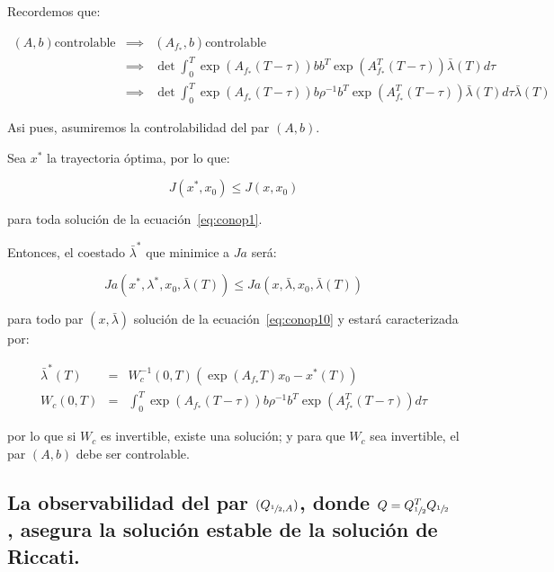             Recordemos que:

            \begin{eqnarray*}
                (A, b) \text{controlable} & \implies & (A_{f_*}, b) \text{controlable} \\
                & \implies & \det{\int_0^T \exp{(A_{f_*}(T - \tau))} b b^T \exp{(A_{f_*}^T (T - \tau))} \bar{\lambda}(T) d\tau} \\
                & \implies & \det{\int_0^T \exp{(A_{f_*}(T - \tau))} b \rho^{-1} b^T \exp{(A_{f_*}^T (T - \tau))} \bar{\lambda}(T) d\tau \bar{\lambda}(T)}
            \end{eqnarray*}

            Asi pues, asumiremos la controlabilidad del par $(A, b)$.

            Sea $x^*$ la trayectoria óptima, por lo que:

            \begin{equation*}
                J(x^*, x_0) \le J(x, x_0)
            \end{equation*}

            para toda solución de la ecuación~\ref{eq:conop1}.

            Entonces, el coestado $\bar{\lambda}^*$ que minimice a $Ja$ será:

            \begin{equation*}
                Ja(x^*, \lambda^*, x_0, \bar{\lambda}(T)) \le Ja(x, \bar{\lambda}, x_0, \bar{\lambda}(T))
            \end{equation*}

            para todo par $(x, \bar{\lambda})$ solución de la ecuación~\ref{eq:conop10} y estará caracterizada por:

            \begin{eqnarray*}
                \bar{\lambda}^*(T) & = & W_c^{-1}(0, T) \left( \exp{(A_{f_*} T)} x_0 - x^*(T) \right) \\
                W_c (0, T) & = & \int_0^T \exp{\left( A_{f_*}(T-\tau) \right)} b \rho^{-1} b^T \exp{\left( A_{f_*}^T(T-\tau) \right)} d\tau
            \end{eqnarray*}

            por lo que si $W_c$ es invertible, existe una solución; y para que $W_c$ sea invertible, el par $(A, b)$ debe ser controlable.


        \subsection{La observabilidad del par $(Q_{\sfrac{1}{2} ,A})$, donde $Q = Q_{\sfrac{1}{2}}^T Q_{\sfrac{1}{2}}$ , asegura la solución estable de la solución de Riccati.}

